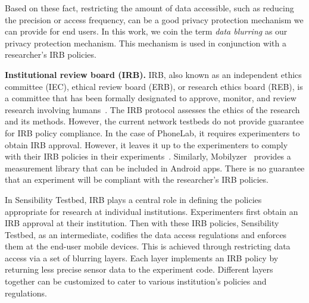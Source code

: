 Based on these fact, restricting 
the amount of data accessible, such as reducing the precision or 
access frequency, can be a good privacy protection mechanism we can 
provide for end users. In this work, we coin the term \textit{data blurring}
as our privacy protection mechanism. This mechanism is used in 
conjunction with a researcher's IRB policies. 

\textbf{Institutional review board (IRB).}
IRB, also known as an independent ethics committee (IEC), ethical 
review board (ERB), or research ethics board (REB), is a committee 
that has been formally designated to approve, monitor, and review 
research involving humans~\cite{irb}. The IRB protocol assesses 
the ethics of the research and its methods. However, the current network 
testbeds do not provide guarantee for IRB policy compliance.
In the case of PhoneLab, it requires experimenters to 
obtain IRB approval. However, it leaves it up to the experimenters 
to comply with their IRB policies in their 
experiments~\cite{nandugudi2013phonelab}. Similarly, 
Mobilyzer~\cite{nikravesh2015mobilyzer} provides a measurement
library that can be included in Android apps. 
There is no guarantee that an 
experiment will be compliant with the researcher's IRB policies.

In Sensibility Testbed, IRB plays a central role in defining the policies
appropriate for research at individual institutions. Experimenters
first obtain an IRB approval at their institution. Then with these IRB
policies, Sensibility Testbed, as an intermediate, codifies the data access 
regulations and enforces them at the end-user 
mobile devices. This is achieved through restricting data access via
a set of blurring layers. Each layer implements an IRB policy by returning 
less precise sensor data to the experiment code. Different layers 
together can be customized to cater to various institution's 
policies and regulations.